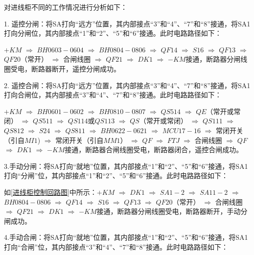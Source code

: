 对进线柜不同的工作情况进行分析如下：

1. 遥控分闸：将SA打向“远方”位置，其内部接点“3”和“4”、“7”和“8”接通，将SA1打向分闸位，其内部接点“1”和“2”、“5”和“6”接通。此时电路路径如下：

$+KM$  $\Longrightarrow $    $BH0603-0604$  $\Longrightarrow $    $BH0804-0806$  $\Longrightarrow $    $QF14$  $\Longrightarrow $    $S16$  $\Longrightarrow $    $QF13$  $\Longrightarrow $    $QF20$（常开）   $\Longrightarrow $    合闸线圈   $\Longrightarrow $    $QF 21$  $\Longrightarrow $    $DK1$   $\Longrightarrow $    $-KM$接通，断路器分闸线圈受电，断路器断开，遥控分闸成功。

2. 遥控合闸：将SA打向“远方”位置，其内部接点“3”和“4”、“7”和“8”接通，将SA1打向合闸位，其内部接点“3”和“4”、“7”和“8”接通。此时电路路径如下：

$+KM$  $\Longrightarrow $    $BH0601-0602$  $\Longrightarrow $    $BH0810-0807$  $\Longrightarrow$    $QS514$  $\Longrightarrow$    $QE$（常开或常闭）  $\Longrightarrow $    $QS511$  $\Longrightarrow$    $QS114$或$QS113$ $\Longrightarrow$    $QS$（常开或常闭）  $\Longrightarrow $    $QS111$  $\Longrightarrow $    $QS812$  $\Longrightarrow $    $S24$  $\Longrightarrow $    $QS811$  $\Longrightarrow $    $BH0622-0621$  $\Longrightarrow $    $MCU17-16$  $\Longrightarrow $    常闭开关（引自$MI1$)  $\Longrightarrow $    常闭开关（引自$MM1$）  $\Longrightarrow $    $QF$  $\Longrightarrow $    $FTJ$  $\Longrightarrow $    合闸线圈  $\Longrightarrow $    $QF$  $\Longrightarrow $    $DK1$  $\Longrightarrow $    $-KM$接通，断路器合闸线圈受电，断路器闭合，遥控合闸成功。

3.手动分闸：将SA打向“就地”位置，其内部接点“1”和“2”、“5”和“6”接通，将SA1打向“分闸”位，其内部接点“1”和“2”、“5”和“6”接通。此时电路路径如下：

如\ref{进线柜控制回路图}中所示：$+KM$  $\Longrightarrow $    $DK1$  $\Longrightarrow $    $SA1-2$  $\Longrightarrow $    $SA11-2$  $\Longrightarrow $    $BH0804-0806$  $\Longrightarrow $    $QF14$  $\Longrightarrow $    $S16$  $\Longrightarrow $    $QF13$  $\Longrightarrow $    $QF20$（常开）  $\Longrightarrow $    合闸线圈  $\Longrightarrow $    $QF21$  $\Longrightarrow $    $DK1$  $\Longrightarrow $    $-KM$接通，断路器分闸线圈受电，断路器断开，手动分闸成功。

4.手动合闸：将SA打向“就地”位置，其内部接点“1”和“2”、“5”和“6”接通，将SA1打向“合闸”位，其内部接点“3”和“4”、“7”和“8”接通。此时电路路径如下：

